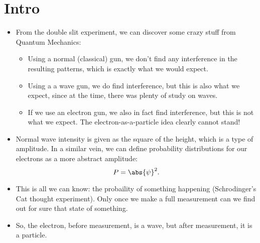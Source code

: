 \section{Intro}
\begin{itemize}
    \item From the double slit experiment, we can discover some crazy stuff from Quantum Mechanics:
    \begin{itemize}
        \item Using a normal (classical) gun, we don't find any interference in the resulting patterns, which is exactly what we would expect.
        \item Using a a wave gun, we do find interference, but this is also what we expect, since at the time, there was plenty of study on waves.
        \item If we use an electron gun, we also in fact find interference, but this is not what we expect. The electron-as-a-particle idea clearly cannot stand!
    \end{itemize}
    \item Normal wave intensity is given as the square of the height, which is a type of amplitude. In a similar vein, we can define probability distributions for our electrons as a more abstract amplitude:
        \begin{equation}
            P = \abs{\psi}^2.
        \end{equation}
    \item This is all we can know: the probaility of something happening (Schrodinger's Cat thought experiment). Only once we make a full measurement can we find out for sure that state of something.
    \item So, the electron, before measurement, is a wave, but after measurement, it is a particle.
\end{itemize}

